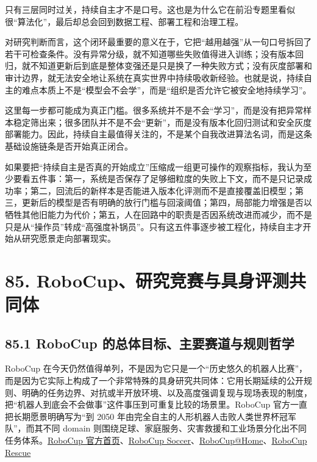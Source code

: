 只有三层同时过关，持续自主才不是口号。这也是为什么它在前沿专题里看似很“算法化”，最后却总会回到数据工程、部署工程和治理工程。

对研究判断而言，这个闭环最重要的意义在于，它把“越用越强”从一句口号拆回了若干可检查条件。没有异常分级，就不知道哪些失败值得进入训练；没有版本回归，就不知道更新后到底是整体变强还是只是换了一种失败方式；没有灰度部署和审计边界，就无法安全地让系统在真实世界中持续吸收新经验。也就是说，持续自主的难点本质上不是“模型会不会学”，而是“组织是否允许它被安全地持续学习”。

这里每一步都可能成为真正门槛。很多系统并不是不会“学习”，而是没有把异常样本稳定筛出来；很多团队并不是不会“更新”，而是没有版本化回归测试和安全灰度部署能力。因此，持续自主最值得关注的，不是某个自我改进算法名词，而是这条基础设施链条是否开始真正闭合。

如果要把“持续自主是否真的开始成立”压缩成一组更可操作的观察指标，我认为至少要看五件事：第一，系统是否保存了足够细粒度的失败上下文，而不是只记录成功率；第二，回流后的新样本是否能进入版本化评测而不是直接覆盖旧模型；第三，更新后的模型是否有明确的放行门槛与回滚阈值；第四，局部能力增强是否以牺牲其他旧能力为代价；第五，人在回路中的职责是否因系统改进而减少，而不是只是从“操作员”转成“高强度补锅员”。只有这五件事逐步被工程化，持续自主才开始从研究愿景走向部署现实。

\section*{85. RoboCup、研究竞赛与具身评测共同体}

\subsection*{85.1 RoboCup 的总体目标、主要赛道与规则哲学}


RoboCup 在今天仍然值得单列，不是因为它只是一个“历史悠久的机器人比赛”，而是因为它实际上构成了一个非常特殊的具身研究共同体：它用长期延续的公开规则、明确的任务边界、对抗或半开放环境、以及高度强调复现与现场表现的制度，把“机器人到底会不会做事”这件事压到可重复比较的场景里。RoboCup 官方一直把长期愿景明确写为“到 2050 年由完全自主的人形机器人击败人类世界杯冠军队”，而其不同 domain 则围绕足球、家庭服务、灾害救援和工业场景分化出不同任务体系。\href{https://www.robocup.org/}{RoboCup 官方首页}、\href{https://www.robocup.org/domains/1}{RoboCup Soccer}、\href{https://athome.robocup.org/}{RoboCup@Home}、\href{https://www.robocup.org/domains/2}{RoboCup Rescue}

